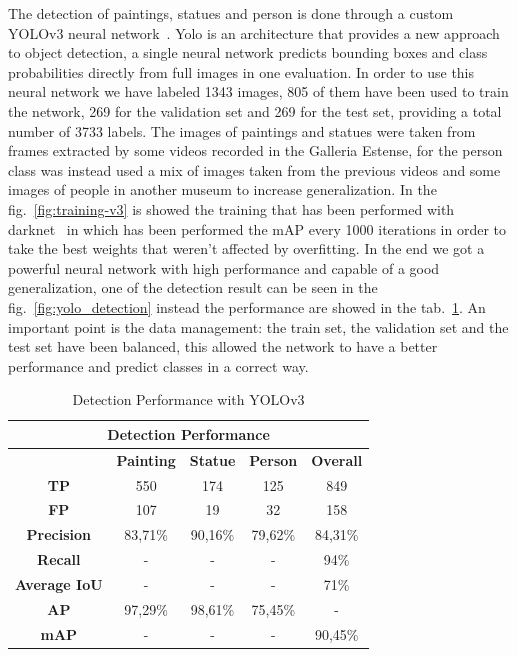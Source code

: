 The detection of paintings, statues and person is done through a custom YOLOv3 neural network~\cite{yolov3}.
Yolo is an architecture that provides a new approach to object detection, a single neural network predicts bounding boxes and class probabilities directly from full images in one evaluation.
In order to use this neural network we have labeled 1343 images, 805 of them have been used to train the network, 269 for the validation set and 269 for the test set, providing a total number of 3733 labels. The images of paintings and statues were taken from frames extracted by some videos recorded in the Galleria Estense, for the person class was instead used a mix of images taken from the previous videos and some images of people in another museum to increase generalization.
In the fig.~\ref{fig:training-v3} is showed the training that has been performed with darknet~\cite{darknet} in which has been performed the mAP every 1000 iterations in order to take the best weights that weren't affected by overfitting.
In the end we got a powerful neural network with high performance and capable of a good generalization, one of the detection result can be seen in the fig.~\ref{fig:yolo_detection} instead the performance are showed in the tab.~\ref{tab:detection_performance}.
An important point is the data management: the train set, the validation set and the test set have been balanced, this allowed the network to have a better performance and predict classes in a correct way.



\begin{table}[ht!]
    \centering
\begin{tabular}{|c|c|c|c|c|}
\hline
\multicolumn{5}{|c|}{\textbf{Detection Performance}}       \\ \hline
\multicolumn{1}{|l|}{} & \textbf{Painting} & \textbf{Statue} & \textbf{Person} & \textbf{Overall} \\ \hline
\textbf{TP}        & 550     & 174     & 125     & 849     \\ \hline
\textbf{FP}        & 107     & 19      & 32      & 158     \\ \hline
\textbf{Precision} & 83,71\% & 90,16\% & 79,62\% & 84,31\% \\ \hline
\textbf{Recall}    & -       & -       & -       & 94\%    \\ \hline
\textbf{Average IoU}       & -       & -       & -       & 71\%    \\ \hline
\textbf{AP}        & 97,29\% & 98,61\% & 75,45\% & -       \\ \hline
\textbf{mAP}       & -       & -       & -       & 90,45\% \\ \hline
\end{tabular}
\caption{Detection Performance with YOLOv3}
    \label{tab:detection_performance}
\end{table}



